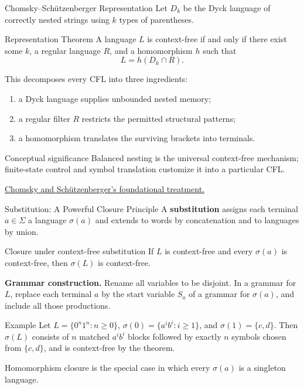 \documentclass[10pt]{beamer}
\newcommand{\paperlink}[2]{%
  \href{#1}{\textcolor{blue!65!black}{#2}}%
}
\begin{document}
\begin{frame}{Chomsky--Sch\"utzenberger Representation}
  \small
  Let $D_k$ be the Dyck language of correctly nested strings using $k$ types
  of parentheses.
  \pause
  \begin{block}{Representation Theorem}
    A language $L$ is context-free if and only if there exist some $k$, a
    regular language $R$, and a homomorphism $h$ such that
    \[
      L=h(D_k\cap R).
    \]
  \end{block}
  \pause
  This decomposes every CFL into three ingredients:
  \begin{enumerate}
    \item a Dyck language supplies unbounded nested memory;
    \item a regular filter $R$ restricts the permitted structural patterns;
    \item a homomorphism translates the surviving brackets into terminals.
  \end{enumerate}
  \begin{exampleblock}{Conceptual significance}
    Balanced nesting is the universal context-free mechanism; finite-state
    control and symbol translation customize it into a particular CFL.
  \end{exampleblock}

  \paperlink{https://doi.org/10.1016/S0049-237X(09)70104-1}{Chomsky and
  Sch\"utzenberger's foundational treatment.}
\end{frame}

\begin{frame}{Substitution: A Powerful Closure Principle}
  \small
  A \textbf{substitution} assigns each terminal $a\in\Sigma$ a language
  $\sigma(a)$ and extends to words by concatenation and to languages by union.
  \pause
  \begin{block}{Closure under context-free substitution}
    If $L$ is context-free and every $\sigma(a)$ is context-free, then
    $\sigma(L)$ is context-free.
  \end{block}
  \textbf{Grammar construction.} Rename all variables to be disjoint. In a
  grammar for $L$, replace each terminal $a$ by the start variable $S_a$ of a
  grammar for $\sigma(a)$, and include all those productions.
  \pause
  \begin{exampleblock}{Example}
    Let $L=\{0^n1^n:n\ge0\}$,
    $\sigma(0)=\{a^ib^i:i\ge1\}$, and
    $\sigma(1)=\{c,d\}$. Then $\sigma(L)$ consists of $n$ matched
    $a^ib^i$ blocks followed by exactly $n$ symbols chosen from $\{c,d\}$,
    and is context-free by the theorem.
  \end{exampleblock}
  Homomorphism closure is the special case in which every $\sigma(a)$ is a
  singleton language.
\end{frame}
\end{document}
